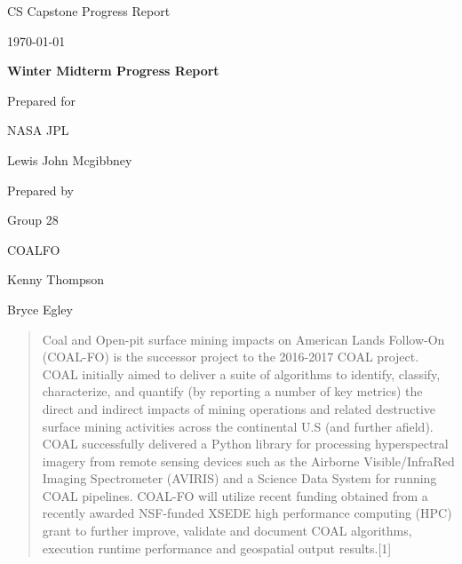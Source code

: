 \documentclass[onecolumn, draftclsnofoot,10pt, compsoc]{IEEEtran}
\def \CapstoneTeamName{		COALFO}
\def \CapstoneTeamNumber{		28}
\def \GroupMemberOne{			Kenny Thompson}
\def \GroupMemberTwo{			Bryce Egley}
\def \CapstoneProjectName{		Winter Midterm Progress Report}
\def \CapstoneSponsorCompany{	NASA JPL}
\def \CapstoneSponsorPerson{		Lewis John Mcgibbney}
\def \DocType{		%
				Progress Report
				}
\newcommand{\NameSigPair}[1]{\par
\makebox[2.75in][r]{#1} \hfil 	\makebox[3.25in]{\makebox[2.25in]{\hrulefill} \hfill		\makebox[.75in]{\hrulefill}}
\par\vspace{-12pt} \textit{\tiny\noindent
\makebox[2.75in]{} \hfil		\makebox[3.25in]{\makebox[2.25in][r]{Signature} \hfill	\makebox[.75in][r]{Date}}}}
\renewcommand{\NameSigPair}[1]{#1}
\begin{document}
\begin{titlepage}
    \begin{singlespace}
        \hfill
        \par\vspace{.2in}
        \centering
        \scshape{
            \huge CS Capstone \DocType \par
            {\large\today}\par
            \vspace{.5in}
            \textbf{\Huge\CapstoneProjectName}\par
            \vfill
            {\large Prepared for}\par
            \Huge \CapstoneSponsorCompany\par
            \vspace{5pt}
            {\Large\NameSigPair{\CapstoneSponsorPerson}\par}
            {\large Prepared by }\par
            Group\CapstoneTeamNumber\par
            \CapstoneTeamName\par
            \vspace{5pt}
            {\Large
                \NameSigPair{\GroupMemberOne}\par
                \NameSigPair{\GroupMemberTwo}\par
            }
            \vspace{20pt}
        }
        \begin{abstract}
        	Coal and Open-pit surface mining impacts on American Lands Follow-On (COAL-FO) is the successor 				project to the 2016-2017 COAL project. COAL initially aimed to deliver a suite of algorithms to identify, classify, characterize, and quantify (by reporting a number of key metrics) the direct and indirect impacts of mining operations and related destructive surface mining activities across the continental U.S (and further afield). COAL successfully delivered a Python library for processing hyperspectral imagery from remote sensing devices such as the Airborne Visible/InfraRed Imaging Spectrometer (AVIRIS) and a Science Data System for running COAL pipelines. COAL-FO will utilize recent funding obtained from a recently awarded NSF-funded XSEDE high performance computing (HPC) grant to further improve, validate and document COAL algorithms, execution runtime performance and geospatial output results.[1]
        \end{abstract}
    \end{singlespace}
\end{titlepage}
\newpage
{}
\tableofcontents
\clearpage
\end{document}
